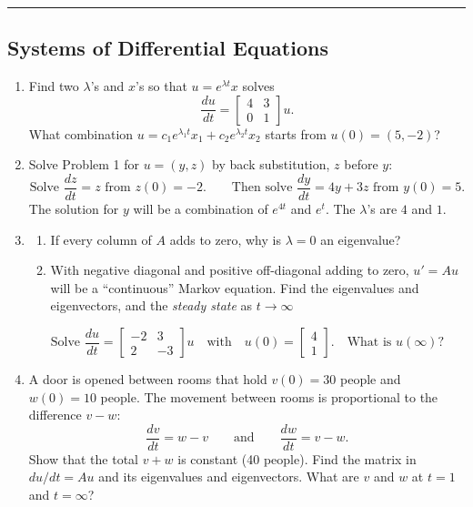 \documentclass[14pt, a4paper]{article}
\begin{document}
\noindent\rule{\textwidth}{0.4pt}

\subsection{Systems of Differential Equations}
\begin{enumerate}
    \item Find two $\lambda$'s and $x$'s so that $u = e^{\lambda t}x$ solves
          \[
              \frac{du}{dt} = \begin{bmatrix} 4 & 3 \\ 0 & 1 \end{bmatrix} u.
          \]
          What combination $u = c_1 e^{\lambda_1 t}x_1 + c_2 e^{\lambda_2 t}x_2$ starts from $u(0) = (5, -2)$?

    \item Solve Problem 1 for $u = (y, z)$ by back substitution, $z$ before $y$:
          \[
              \text{Solve } \frac{dz}{dt} = z \text{ from } z(0) = -2. \qquad \text{Then solve } \frac{dy}{dt} = 4y + 3z \text{ from } y(0) = 5.
          \]
          The solution for $y$ will be a combination of $e^{4t}$ and $e^t$. The $\lambda$'s are $4$ and $1$.

    \item
          \begin{enumerate}
              \item If every column of $A$ adds to zero, why is $\lambda = 0$ an eigenvalue?
              \item With negative diagonal and positive off-diagonal adding to zero, $u' = Au$ will be a ``continuous'' Markov equation. Find the eigenvalues and eigenvectors, and the \textit{steady state} as $t \to \infty$
          \end{enumerate}
          \[
              \text{Solve } \frac{du}{dt} = \begin{bmatrix} -2 & 3 \\ 2 & -3 \end{bmatrix} u \quad \text{with} \quad u(0) = \begin{bmatrix} 4 \\ 1 \end{bmatrix}. \quad \text{What is } u(\infty)?
          \]

    \item A door is opened between rooms that hold $v(0) = 30$ people and $w(0) = 10$ people. The movement between rooms is proportional to the difference $v - w$:
          \[
              \frac{dv}{dt} = w - v \qquad \text{and} \qquad \frac{dw}{dt} = v - w.
          \]
          Show that the total $v + w$ is constant (40 people). Find the matrix in $du/dt = Au$ and its eigenvalues and eigenvectors. What are $v$ and $w$ at $t = 1$ and $t = \infty$?


\end{enumerate}
\end{document}
